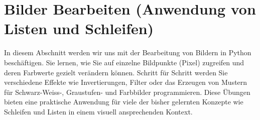 \section{Bilder Bearbeiten (Anwendung von Listen und Schleifen)}
In diesem Abschnitt werden wir uns mit der Bearbeitung von Bildern in Python beschäftigen.
Sie lernen, wie Sie auf einzelne Bildpunkte (Pixel) zugreifen und deren Farbwerte gezielt verändern können.
Schritt für Schritt werden Sie verschiedene Effekte wie Invertierungen, Filter oder das Erzeugen von Mustern für Schwarz-Weiss-, Graustufen- und Farbbilder programmieren.
Diese Übungen bieten eine praktische Anwendung für viele der bisher gelernten Konzepte wie Schleifen und Listen in einem visuell ansprechenden Kontext.









